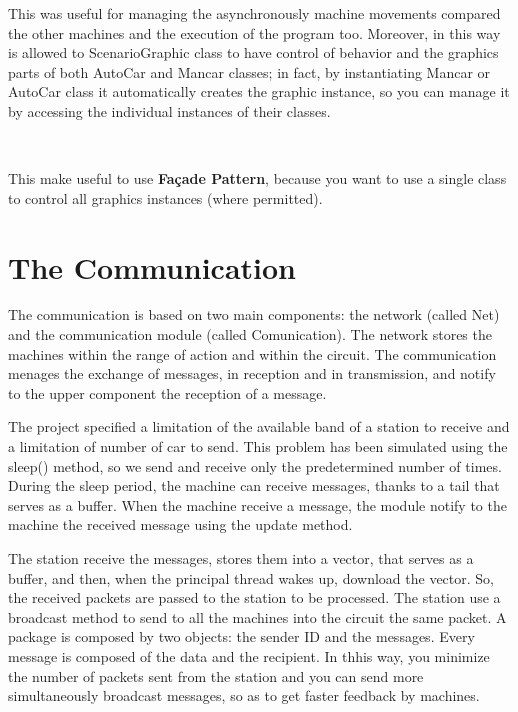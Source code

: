 \documentclass[a4paper,titlepage]{article}
\begin{document}
This was useful for managing the asynchronously machine movements compared the other machines and the execution of the program too. Moreover, in this way is allowed to ScenarioGraphic class to have control of behavior and the graphics parts of both AutoCar and Mancar classes; in fact, by instantiating Mancar or AutoCar class it automatically creates the graphic instance, so you can manage it by accessing the individual instances of their classes.

~

This make useful to use \textbf{Façade Pattern}, because you want to use a single class to control all graphics instances (where permitted).

\newpage

\part{The Communication}

The communication is based on two main components: the network (called Net) and the communication module (called Comunication). The network stores the machines within the range of action and within the circuit. The communication menages the exchange of messages, in reception and in transmission, and notify to the upper component the reception of a message.

The project specified a limitation of the available band of a station to receive and a limitation of number of car to send. This problem has been simulated using the sleep() method, so we send and receive only the predetermined number of times.
During the sleep period, the machine can receive messages, thanks to a tail that serves as a buffer. When the machine receive a message, the module notify to the machine the received message using the update method.

The station receive the messages, stores them into a vector, that serves as a buffer, and then, when the principal thread wakes up, download the vector. So, the received packets are passed to the station to be processed.
The station use a broadcast method to send to all the machines into the circuit the same packet.
A package is composed by two objects: the sender ID and the messages. Every message is composed of the data and the recipient. In thhis way, you minimize the number of packets sent from the station and you can send more simultaneously broadcast messages, so as to get faster feedback by machines.
\end{document}
